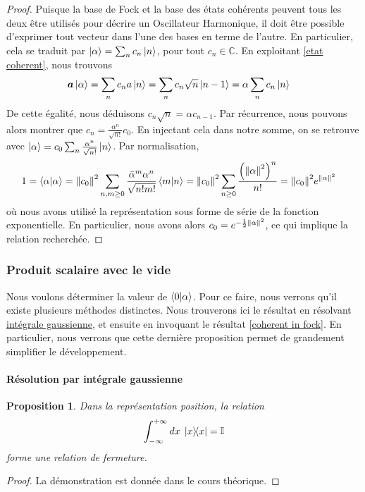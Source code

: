 \documentclass[11pt,oneside,a4paper]{article}
\newtheorem{property}[theorem]{Proposition}
\begin{document}
\begin{proof}
  Puisque la base de Fock et la base des états cohérents peuvent tous les deux être utilisés pour décrire un Oscillateur Harmonique, il doit être possible d'exprimer tout vecteur dans l'une des bases en terme de l'autre. En particulier, cela se traduit par $\ket{\alpha} = \sum_n c_n \ket{n}$, pour tout $c_n\in\mathbb{C}$. En exploitant \eqref{etat coherent}, nous trouvons
  \begin{align*}
    \bm{a}\ket{\alpha} = \sum_n c_n a\ket{n} = \sum_n c_n\sqrt{n}\ket{n-1} &= \alpha\sum_n c_n \ket{n}
  \end{align*}
  De cette égalité, nous déduisons $c_n\sqrt{n}=\alpha c_{n-1}$. Par récurrence, nous pouvons alors montrer que $c_n = \frac{\alpha^n}{\sqrt{n!}}c_0$. En injectant cela dans notre somme, on se retrouve avec $\ket{\alpha} = c_0\sum_n \frac{\alpha^n}{\sqrt{n!}}\ket{n}$. Par normalisation,
  \begin{align*}
    1 = \braket{\alpha} &= \norm{c_0}^2 \sum_{n,m\geq 0} \frac{\bar{\alpha}^m\alpha^n}{\sqrt{n!m!}}\braket{m}{n} = \norm{c_0}^2\sum_{n\geq 0} \frac{\left(\norm{\alpha}^2\right)^n}{n!} = \norm{c_0}^2e^{\norm{\alpha}^2}
  \end{align*}
  où nous avons utilisé la représentation sous forme de série de la fonction exponentielle. En particulier, nous avons alors $c_0 = e^{-\frac{1}{2}\norm{\alpha}^2}$, ce qui implique la relation recherchée.
\end{proof}

\subsubsection{Produit scalaire avec le vide}
\label{intégrale gaussienne}
Nous voulons déterminer la valeur de $\braket{0}{\alpha}$. Pour ce faire, nous verrons qu'il existe plusieurs méthodes distinctes. Nous trouverons ici le résultat en résolvant \href{https://en.wikipedia.org/wiki/Gaussian_integral}{intégrale gaussienne}, et ensuite en invoquant le résultat \ref{coherent in fock}. En particulier, nous verrons que cette dernière proposition permet de grandement simplifier le développement.
\paragraph{Résolution par intégrale gaussienne}

\begin{property}
  Dans la représentation position, la relation
  \begin{equation}
    \int_{-\infty}^{+\infty}dx \; \ketbra{x} = \mathbb{I}
  \end{equation}
  forme une relation de fermeture.
\end{property}
\begin{proof}
  La démonstration est donnée dans le cours théorique.
\end{proof}
\end{document}
